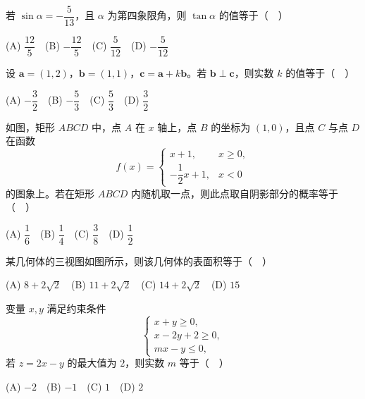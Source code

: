 \begin{question}

若 \(\sin\alpha=-\dfrac{5}{13}\)，且 \(\alpha\) 为第四象限角，则 \(\tan\alpha\) 的值等于（　）

(A) \(\dfrac{12}{5}\)　(B) \(-\dfrac{12}{5}\)　(C) \(\dfrac{5}{12}\)　(D) \(-\dfrac{5}{12}\)

\end{question}
\begin{question}

设 \(\boldsymbol a=(1,2)\)，\(\boldsymbol b=(1,1)\)，\(\boldsymbol c=\boldsymbol a+k\boldsymbol b\)。若 \(\boldsymbol b\perp\boldsymbol c\)，则实数 \(k\) 的值等于（　）

(A) \(-\dfrac32\)　(B) \(-\dfrac53\)　(C) \(\dfrac53\)　(D) \(\dfrac32\)

\Needspace{0.4\textheight}
\end{question}
\begin{question}

如图，矩形 \(ABCD\) 中，点 \(A\) 在 \(x\) 轴上，点 \(B\) 的坐标为 \((1,0)\)，且点 \(C\) 与点 \(D\) 在函数
\nopagebreak[4]
\[
f(x)=\begin{cases}
x+1,&x\geqslant0,\\
-\dfrac12x+1,&x<0
\end{cases}
\]
的图象上。若在矩形 \(ABCD\) 内随机取一点，则此点取自阴影部分的概率等于（　）

(A) \(\dfrac16\)　(B) \(\dfrac14\)　(C) \(\dfrac38\)　(D) \(\dfrac12\)
\nopagebreak[4]
\begin{center}\end{center}
\nopagebreak[4]
\Needspace{0.4\textheight}
\end{question}
\begin{question}

某几何体的三视图如图所示，则该几何体的表面积等于（　）

(A) \(8+2\sqrt2\)　(B) \(11+2\sqrt2\)　(C) \(14+2\sqrt2\)　(D) \(15\)
\nopagebreak[4]
\begin{center}\end{center}
\nopagebreak[4]
\end{question}
\begin{question}

变量 \(x,y\) 满足约束条件
\nopagebreak[4]
\[
\begin{cases}
x+y\geqslant0,\\
x-2y+2\geqslant0,\\
mx-y\leqslant0,
\end{cases}
\]
若 \(z=2x-y\) 的最大值为 \(2\)，则实数 \(m\) 等于（　）

(A) \(-2\)　(B) \(-1\)　(C) \(1\)　(D) \(2\)

\end{question}
